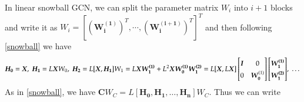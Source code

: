 \documentclass{article}
\newcommand{\colvec}[2][1]{%
	\scalebox{#1}{%
		\renewcommand{\arraystretch}{1.45}%
		$\begin{bmatrix}#2\end{bmatrix}$%
	}
}
\begin{document}
In linear snowball GCN, we can split the parameter matrix $W_i$ into $i+1$ blocks and write it as $W_i=\left[ (\bm{W_i^{(1)}})^T, \cdots , (\bm{W_i^{(i+1)}})^T \right]^T$ and then following \eqref{snowball} we have
\begin{equation*}
 \bm{H_0} = \bm{X}, \; \bm{H_1} = L\bm{X} W_0, \; \bm{H_2} = L[\bm{X}, \bm{H_1} ]W_1 = L\bm{X} \bm{W_1^{(1)}} +  L^2 \bm{X}\bm{ W_0^{(1)} W_1^{(2)}} = L [\bm{X}, L\bm{X}]
 \begin{bmatrix}
 \bm{I} & 0\\
 0 & \bm{W_0}^{(1)}
\end{bmatrix} \colvec{ \bm{W_1^{(1)}} \\ \bm{W_1^{(2)}} },\; \dots %
\end{equation*}
As in \eqref{snowball}, we have $\bm{C}W_C = L[\bm{H_0}, \bm{H_1},\dots, \bm{H_n}] W_C$. Thus we can write

\end{document}
